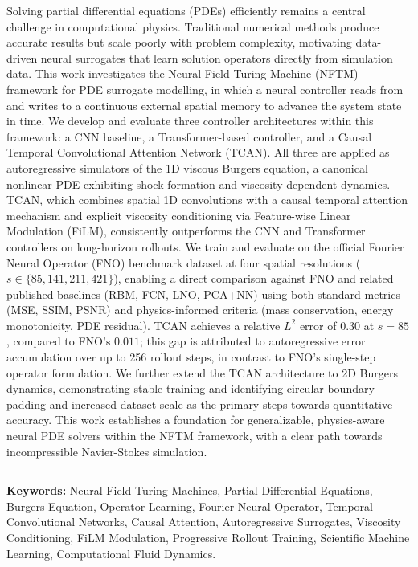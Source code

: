 \documentclass[a4paper,11pt,twoside]{ThesisStyle}
\begin{document}
\cleardoublepage
\begin{vcenterpage}


Solving partial differential equations (PDEs) efficiently remains a central challenge in computational physics. Traditional numerical methods produce accurate results but scale poorly with problem complexity, motivating data-driven neural surrogates that learn solution operators directly from simulation data. This work investigates the Neural Field Turing Machine (NFTM) framework for PDE surrogate modelling, in which a neural controller reads from and writes to a continuous external spatial memory to advance the system state in time. We develop and evaluate three controller architectures within this framework: a CNN baseline, a Transformer-based controller, and a Causal Temporal Convolutional Attention Network (TCAN). All three are applied as autoregressive simulators of the 1D viscous Burgers equation, a canonical nonlinear PDE exhibiting shock formation and viscosity-dependent dynamics. TCAN, which combines spatial 1D convolutions with a causal temporal attention mechanism and explicit viscosity conditioning via Feature-wise Linear Modulation (FiLM), consistently outperforms the CNN and Transformer controllers on long-horizon rollouts. We train and evaluate on the official Fourier Neural Operator (FNO) benchmark dataset at four spatial resolutions ($s \in \{85, 141, 211, 421\}$), enabling a direct comparison against FNO and related published baselines (RBM, FCN, LNO, PCA+NN) using both standard metrics (MSE, SSIM, PSNR) and physics-informed criteria (mass conservation, energy monotonicity, PDE residual). TCAN achieves a relative $L^2$ error of $0.30$ at $s{=}85$, compared to FNO's $0.011$; this gap is attributed to autoregressive error accumulation over up to 256 rollout steps, in contrast to FNO's single-step operator formulation. We further extend the TCAN architecture to 2D Burgers dynamics, demonstrating stable training and identifying circular boundary padding and increased dataset scale as the primary steps towards quantitative accuracy. This work establishes a foundation for generalizable, physics-aware neural PDE solvers within the NFTM framework, with a clear path towards incompressible Navier-Stokes simulation.
\noindent\rule[2pt]{\textwidth}{0.5pt}
{\large\textbf{Keywords:}}
Neural Field Turing Machines, Partial Differential Equations, Burgers Equation, Operator Learning, Fourier Neural Operator, Temporal Convolutional Networks, Causal Attention, Autoregressive Surrogates, Viscosity Conditioning, FiLM Modulation, Progressive Rollout Training, Scientific Machine Learning, Computational Fluid Dynamics.

\end{vcenterpage}
\end{document}
